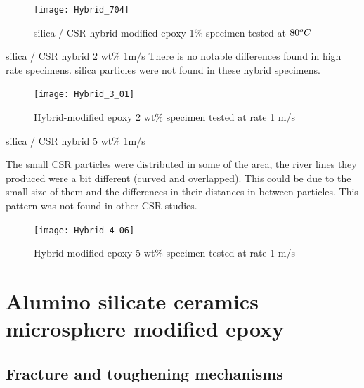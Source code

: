 \documentclass[numbers=noendperiod,chapterprefix=on]{icldt} %
\begin{document}
\begin{figure}[!htpb]
\centering
\texttt{[image: Hybrid\_704]}
\caption{silica / CSR hybrid-modified epoxy 1\% specimen tested at  $\-80 ^oC$}\label{Hybrid_704}
\end{figure}
\FloatBarrier

silica / CSR hybrid 2 wt\% 1m/s
There is no notable differences found in high rate specimens. silica particles were not found in these hybrid specimens.

\begin{figure}[!htpb]
\centering
\texttt{[image: Hybrid\_3\_01]}
\caption{Hybrid-modified epoxy 2 wt\% specimen tested at rate 1 m/s}\label{Hybrid_3_01}
\end{figure}
\FloatBarrier


silica / CSR hybrid 5 wt\% 1m/s

The small CSR particles were distributed in some of the area, the river lines they produced were a bit different (curved and overlapped). This could be due to the small size of them and the differences in their distances in between particles. This pattern was not found in other CSR studies. 

\begin{figure}[!htpb]
\centering
\texttt{[image: Hybrid\_4\_06]}
\caption{Hybrid-modified epoxy 5 wt\% specimen tested at rate 1 m/s}\label{Hybrid_4_06}
\end{figure}
\FloatBarrier




\section{Alumino silicate ceramics microsphere modified epoxy}

\subsection{Fracture and toughening mechanisms}
\end{document}
